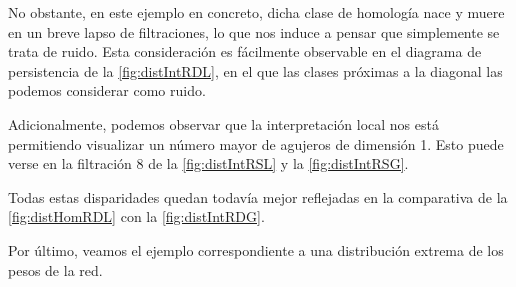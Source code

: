 \documentclass[12pt, a4paper, twoside]{book}
\numberwithin{equation}{section}
\theoremstyle{definition}
\newenvironment{ejem}
  {\pushQED{\qed}\renewcommand{\qedsymbol}{$\blacktriangleleft$}\ejemplo}
  {\popQED\endejemplo}
\theoremstyle{remark}
\theoremstyle{plain}
\begin{document}
\begin{ejem}
	No obstante, en este ejemplo en concreto, dicha clase de homología 
	nace y muere en un breve lapso de filtraciones, lo que nos induce a 
	pensar que simplemente se trata de ruido. Esta consideración es 
	fácilmente observable en el diagrama de persistencia de la 
	\autoref{fig:distIntRDL}, en el que las clases próximas a la diagonal 
	las podemos considerar como ruido.

	Adicionalmente, podemos observar que la interpretación local nos está 
	permitiendo visualizar un número mayor de agujeros de dimensión 1. 
	Esto puede verse en la filtración 8 de la \autoref{fig:distIntRSL} y 
	la \autoref{fig:distIntRSG}.

	Todas estas disparidades quedan todavía mejor reflejadas en la 
	comparativa de la \autoref{fig:distHomRDL} con la 
	\autoref{fig:distIntRDG}.
	\end{ejem}

	Por último, veamos el ejemplo correspondiente a una distribución 
	extrema de los pesos de la red.
\end{document}
